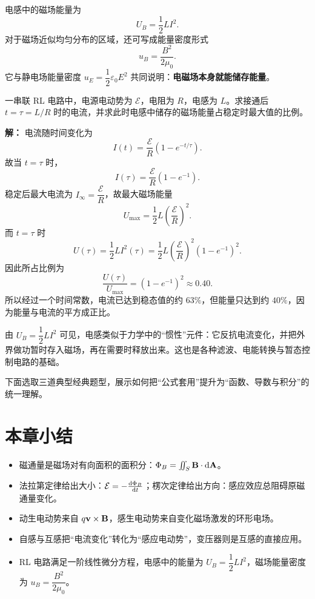 电感中的磁场能量为
\[
U_B=\frac{1}{2}LI^2.
\]
对于磁场近似均匀分布的区域，还可写成能量密度形式
\[
 u_B=\frac{B^2}{2\mu_0}.
\]
它与静电场能量密度 $u_E=\dfrac{1}{2}\varepsilon_0 E^2$ 共同说明：\textbf{电磁场本身就能储存能量}。

\begin{example}
一串联 RL 电路中，电源电动势为 $\mathcal{E}$，电阻为 $R$，电感为 $L$。求接通后 $t=\tau=L/R$ 时的电流，并求此时电感中储存的磁场能量占稳定时最大值的比例。

\textbf{解：} 电流随时间变化为
\[
I(t)=\frac{\mathcal{E}}{R}\left(1-e^{-t/\tau}\right).
\]
故当 $t=\tau$ 时，
\[
I(\tau)=\frac{\mathcal{E}}{R}\left(1-e^{-1}\right).
\]
稳定后最大电流为 $I_{\infty}=\dfrac{\mathcal{E}}{R}$，故最大磁场能量
\[
U_{\max}=\frac{1}{2}L\left(\frac{\mathcal{E}}{R}\right)^2.
\]
而 $t=\tau$ 时
\[
U(\tau)=\frac{1}{2}L I^2(\tau)=\frac{1}{2}L\left(\frac{\mathcal{E}}{R}\right)^2\left(1-e^{-1}\right)^2.
\]
因此所占比例为
\[
\frac{U(\tau)}{U_{\max}}=\left(1-e^{-1}\right)^2\approx 0.40.
\]
所以经过一个时间常数，电流已达到稳态值的约 $63\%$，但能量只达到约 $40\%$，因为能量与电流的平方成正比。
\end{example}

\begin{remark}
由 $U_B=\dfrac{1}{2}LI^2$ 可见，电感类似于力学中的“惯性”元件：它反抗电流变化，并把外界做功暂时存入磁场，再在需要时释放出来。这也是各种滤波、电能转换与暂态控制电路的基础。
\end{remark}

下面选取三道典型经典题型，展示如何把“公式套用”提升为“函数、导数与积分”的统一理解。

\section*{本章小结}

\begin{itemize}
  \item 磁通量是磁场对有向面积的面积分：$\Phi_B=\iint_S \vb{B}\cdot \dd \vb{A}$。
  \item 法拉第定律给出大小：$\mathcal{E}=-\dv{\Phi_B}{t}$；楞次定律给出方向：感应效应总阻碍原磁通量变化。
  \item 动生电动势来自 $q\vb{v}\times\vb{B}$，感生电动势来自变化磁场激发的环形电场。
  \item 自感与互感把“电流变化”转化为“感应电动势”，变压器则是互感的直接应用。
  \item RL 电路满足一阶线性微分方程，电感中的能量为 $U_B=\dfrac{1}{2}LI^2$，磁场能量密度为 $u_B=\dfrac{B^2}{2\mu_0}$。
\end{itemize}

